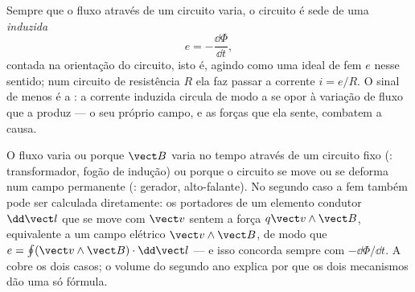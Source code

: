 \begin{theorem}\label{thm:b1:induction:faraday}
Sempre que o fluxo através de um circuito varia, o circuito é sede de
uma \emph{ induzida}
\[
e = -\frac{\dd\Phi}{\dd t} ,
\]
contada na orientação do circuito, isto é, agindo como uma  ideal de fem $e$ nesse sentido; num circuito de resistência $R$
ela faz passar a corrente $i = e/R$. O sinal de menos é a \emph{}:
a corrente induzida circula de modo a se opor à variação de fluxo que a
produz --- o seu próprio campo, e as forças que ela sente, combatem a causa.
\end{theorem}
\admitted

\begin{remark}\label{rem:b1:induction:twofaces}
O fluxo varia ou porque $\vect B$ varia no tempo através de um
circuito fixo (\emph{}: transformador, fogão de indução)
ou porque o circuito se move ou se deforma num campo permanente
(\emph{}: gerador, alto-falante). No segundo caso
a fem também pode ser calculada diretamente: os portadores de um elemento
condutor $\dd\vect l$ que se move com $\vect v$ sentem a força $q\vect v\wedge
\vect B$, equivalente a um campo elétrico $\vect v\wedge\vect B$, de modo que
$e = \oint(\vect v\wedge\vect B)\cdot\dd\vect l$ --- e isso concorda sempre
com $-\dd\Phi/\dd t$. A  cobre os dois casos; o volume do segundo ano
explica por que os dois mecanismos dão uma só fórmula.
\end{remark}

